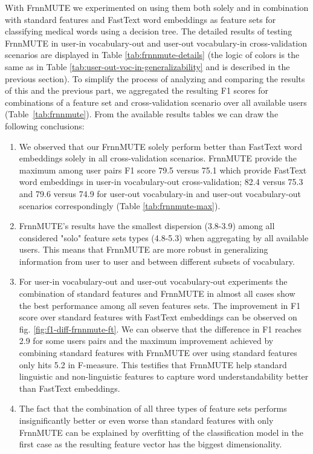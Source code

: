 With FrnnMUTE we experimented on using them both solely and in combination with standard features and FastText word embeddings as feature sets for classifying medical words using a decision tree. The detailed results of testing FrnnMUTE in user-in vocabulary-out and user-out vocabulary-in cross-validation scenarios are displayed in Table \ref{tab:frnnmute-details} (the logic of colors is the same as in Table \ref{tab:user-out-voc-in-generalizability} and is described in the previous section). To simplify the process of analyzing and comparing the results of this and the previous part, we aggregated the resulting F1 scores for combinations of a feature set and cross-validation scenario over all available users (Table~\ref{tab:frnnmute}).  From the available results tables we can draw the following conclusions:
\begin{enumerate}
    \item We observed that our FrnnMUTE solely perform better than FastText word embeddings solely in all cross-validation scenarios. FrnnMUTE provide the maximum among user pairs F1 score 79.5 versus 75.1 which provide FastText word embeddings in user-in vocabulary-out cross-validation; 82.4 versus 75.3 and 79.6 versus 74.9 for user-out vocabulary-in and user-out vocabulary-out scenarios correspondingly (Table \ref{tab:frnnmute-max}).
    
    \item FrnnMUTE's results have the smallest dispersion (3.8-3.9)  among all considered "solo" feature sets types (4.8-5.3) when aggregating by all available users. This means that FrnnMUTE are more robust in generalizing information from user to user and between different subsets of vocabulary.
    
    \item For user-in vocabulary-out and user-out vocabulary-out experiments the combination of standard features and FrnnMUTE in almost all cases show the best performance among all seven features sets. The improvement in F1 score over standard features with  FastText embeddings can be observed on fig. \ref{fig:f1-diff-frnnmute-ft}. We can observe that the difference in F1 reaches 2.9 for some users pairs and the maximum improvement achieved by combining standard features with FrnnMUTE over using standard features only hits 5.2 in F-measure.  This testifies that FrnnMUTE help standard linguistic and non-linguistic features to capture word understandability better than FastText embeddings.  
    
    \item The fact that the combination of all three types of feature sets performs insignificantly better or even worse than standard features with only FrnnMUTE can be explained by overfitting of the classification model in the first case as the resulting feature vector has the biggest dimensionality.
\end{enumerate}


